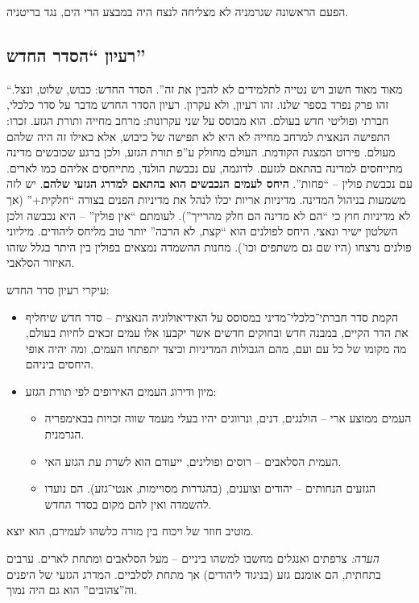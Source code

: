 \documentclass[a4paper]{book}
\begin{document}
	הפעם הראשונה שגרמניה לא מצליחה לנצח היה במבצע הרי הים, נגד בריטניה. 
	
	\subsection{רעיון ``הסדר החדש''}
	``מאוד מאוד חשוב ויש נטייה לתלמידים לא להבין את זה''. הסדר החדש: כבוש, שלוט, ונצל. זהו פרק נפרד בספר שלנו. זהו רעיון, ולא עקרון. רעיון הסדר החדש מדבר על סדר כלכלי, חברתי ופוליטי חדש בעולם. הוא מבוסס על שני עקרונות: מרחב מחייה ותורת הגזע. זכרו: התפישה הנאצית למרחב מחייה לא היא לא תפישה של כיבוש, אלא כאילו זה היה שלהם מעולם. פירוט המצגת הקודמת. העולם מחולק ע''פ תורת הגזע, ולכן ברגע שכובשים מדינה מתייחסים למדינה בהתאם לגזעם. לדוגמה, עם נכבשת הולנד, מתייחסים אליהם כמו לארים. עם נכבשת פולין – ``פחות''. \textbf{היחס לעמים הנכבשים הוא בהתאם למדרג הגזעי שלהם}. יש לזה משמעות בניהול המדינה. מדיניות אריות יכלו לנהל את מדיניות הפנים בצורה ``חלקית+'' (אך לא מדיניות חוץ כי ``הם לא מדינה הם חלק מהרייך''). לעומתם ``אין פולין'' – היא נכבשה ולכן השלטון ישיר ונאצי. היחס לפולנים הוא ``קצת, לא הרבה'' יותר טוב מליחס ליהודים. מיליוני פולנים נרצחו (היו שם גם משתפים וכו'). מחנות ההשמדה נמצאים בפולין בין היתר בגלל שזהו האיזור הסלאבי. 
	
	עיקרי רעיון סדר החדש: 
	\begin{itemize}
		\item הקמת סדר חברתי־כלכלי־מדיני במסוסס על האידיאולוגיה הנאצית – סדר חדש שיחליף את הדר הקיים, במבנה חדש ובחוקים חדשים אשר יקבעו אלו עמים זכאים לחיות בעולם, מה מקומו של כל עם ועם, מהם הגבולות המדיניות וכיצד יתפתחו העמים, ומה יהיה אופי היחסים ביניהם. 
		\item מיון ודירוג העמים האירופים לפי תורת הגזע: 
		\begin{itemize}
			\item העמים ממוצע ארי – הולנגים, דנים, ונרווגים יהיו בעלי מעמד שווה זכויות בבאימפריה הגרמנית. 
			\item העמית הסלאבים – רוסים ופולינים, ייעודם הוא לשרת עת הגזע האי. 
			\item הגזעים הנחותים – יהודים וצוענים, (בהגדרות מסויימות, אנטי־גזע). הם נועדו להשמדה ואין להם מקום בסדר החדש. 
		\end{itemize}
	\end{itemize}
	מוטיב חוזר של ויכוח בין מורה כלשהו לעמירם, הוא יוצא. 
	
	\textit{הערה: }צרפתים ואנגלים מחשבו למשהו ביניים – מעל הסלאבים ומתחת לארים. ערבים בתחתית, הם אומנם גזע (בניגוד ליהודים) אך מתחת לסלביים. המדרג הגזעי של היפנים וה''צהובים'' הוא גם היה נמוך. 
	
\end{document}
